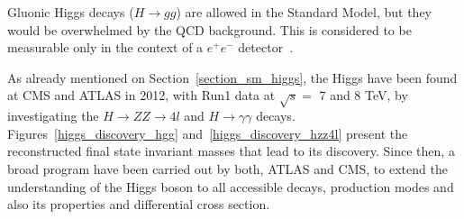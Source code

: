 Gluonic Higgs decays ($H \rightarrow gg$) are allowed in the Standard Model, but they would be overwhelmed by the QCD background. This is considered to be measurable only in the context of a $e^{+}e^{-}$ detector~\cite{Spira:1995rr}.

As already mentioned on Section~\ref{section_sm_higgs}, the Higgs have been found at CMS and ATLAS in 2012, with Run1 data at $\sqrt{s} =$ 7 and 8 TeV, by investigating the $H \rightarrow ZZ \rightarrow 4l$ and $H \rightarrow \gamma\gamma$ decays. Figures~\ref{higgs_discovery_hgg} and~\ref{higgs_discovery_hzz4l} present the reconstructed final state invariant masses that lead to its discovery. Since then, a broad program have been carried out by both, ATLAS and CMS, to extend the understanding of the Higgs boson to all accessible decays, production modes and also its properties and differential cross section.

